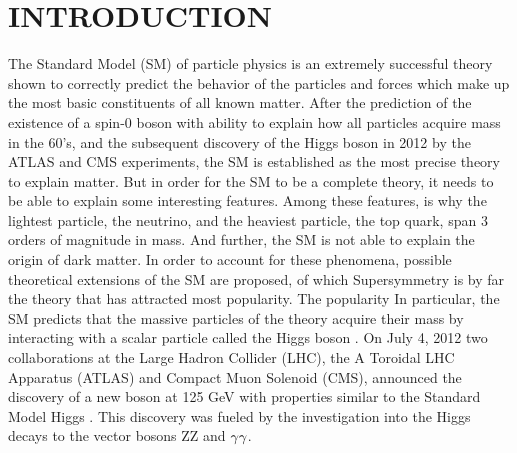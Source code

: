 \chapter{INTRODUCTION} \label{intro}

The Standard Model (SM) of particle physics is an extremely successful theory shown to correctly predict the behavior of the particles and forces which make up the most basic constituents of all known matter. After the prediction of the existence of a spin-0 boson with ability to explain how all particles acquire mass in the 60's, and the subsequent discovery of the Higgs boson in 2012 by the ATLAS and CMS experiments, the SM is established as the most precise theory to explain matter. 
But in order for the SM to be a complete theory, it needs to be able to explain some interesting features. Among these features, is why the lightest particle, the neutrino, and the heaviest particle, the top quark, span 3 orders of magnitude in mass. And further, the SM is not able to explain the origin of dark matter. In order to account for these phenomena, possible theoretical extensions of the SM are proposed, of which Supersymmetry is by far the theory that has attracted most popularity. The popularity     
In particular, the SM predicts that the massive particles of the theory acquire their mass by interacting with a scalar particle called the Higgs boson \cite{higgs1,higgs2,higgs3,qftam}. On July 4, 2012 two collaborations at the Large Hadron Collider (LHC), the A Toroidal LHC Apparatus (ATLAS) and Compact Muon Solenoid (CMS), announced the discovery of a new boson at 125 GeV with properties similar to the Standard Model Higgs \cite{atlasdiscovery,cmsdiscovery2012,cmsdiscovery2013}. This discovery was fueled by the investigation into the Higgs decays to the vector bosons ZZ and ${\rm \gamma\gamma}$. 

